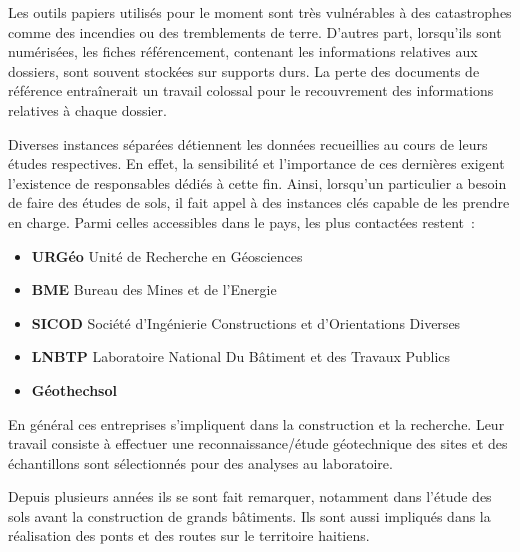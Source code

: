 \par
Les outils papiers utilisés pour le moment sont très vulnérables à des
catastrophes comme des incendies ou des tremblements de terre. D'autres
part, lorsqu'ils sont numérisées, les fiches référencement, contenant les
informations relatives aux dossiers, sont souvent stockées sur supports
durs. La perte des documents de référence entraînerait un travail
colossal pour le recouvrement des informations relatives à chaque 
dossier.
\par
Diverses instances séparées détiennent les données recueillies au cours
de leurs études respectives. En effet, la sensibilité et l’importance de
ces dernières exigent l’existence de responsables dédiés à cette fin. 
Ainsi, lorsqu’un particulier a besoin de faire des études de sols, il 
fait appel à des instances clés capable de les prendre en charge. 
Parmi celles accessibles dans le pays, les plus contactées restent :
\begin{itemize}
    \item \textbf{URGéo}
    Unité de Recherche en Géosciences 
    \item \textbf{BME}
    Bureau des Mines et de l’Energie
    \item \textbf{SICOD}
    Société d’Ingénierie Constructions et d’Orientations Diverses
    \item \textbf{LNBTP}
    Laboratoire National Du Bâtiment et des Travaux Publics 
    \item \textbf{Géothechsol}
\end{itemize}   

\par
En général ces entreprises s'impliquent dans la construction et la recherche. 
Leur travail consiste à effectuer une reconnaissance/étude géotechnique des sites et
des échantillons  sont sélectionnés pour des analyses au laboratoire.
\par
Depuis plusieurs années ils se sont fait remarquer, notamment dans
l'étude des sols avant la construction de grands bâtiments. Ils sont aussi impliqués
dans la réalisation des ponts et des routes sur le territoire
haitiens. 